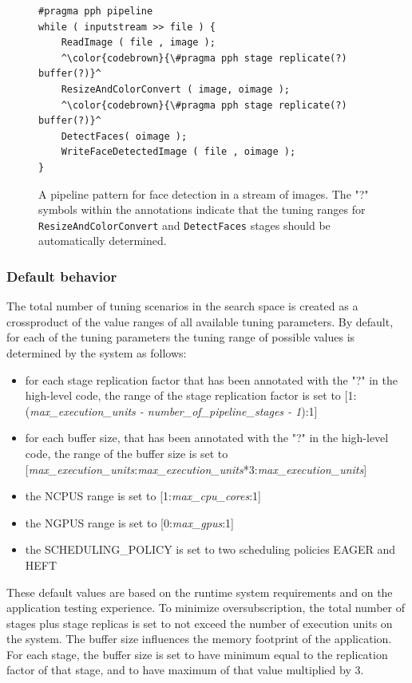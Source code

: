 \begin{figure}[h]
\centering
\begin{lstlisting}
#pragma pph pipeline
while ( inputstream >> file ) {
    ReadImage ( file , image );
    ^\color{codebrown}{\#pragma pph stage replicate(?) buffer(?)}^
    ResizeAndColorConvert ( image, oimage );
    ^\color{codebrown}{\#pragma pph stage replicate(?) buffer(?)}^
    DetectFaces( oimage );
    WriteFaceDetectedImage ( file , oimage );
}
\end{lstlisting}
\caption{A pipeline pattern for face detection in a stream of images. The "?" symbols within the annotations indicate that the tuning ranges for \texttt{ResizeAndColorConvert} and \texttt{DetectFaces} stages should be automatically determined.}
\label{fig:facedetect}
\end{figure}

\subsubsection{Default behavior}

The total number of tuning scenarios in the search space is created as a crossproduct of the value ranges of all available tuning parameters. By default, for each of the tuning parameters the tuning range of possible values is determined by the system as follows:  

\begin{itemize}
\item for each stage replication factor that has been annotated with the "?" in the high-level code, the range of the stage replication factor is set to [1:(\textit{max\_execution\_units - number\_of\_pipeline\_stages - 1}):1]
\item for each buffer size, that has been annotated with the "?" in the high-level code, the range of the buffer size is set to [\textit{max\_execution\_units}:\textit{max\_execution\_units}*3:\textit{max\_execution\_units}]
\item the NCPUS range is set to [1:\textit{max\_cpu\_cores}:1]
\item the NGPUS range is set to [0:\textit{max\_gpus}:1]
\item {the SCHEDULING\_POLICY is set to two scheduling policies EAGER and HEFT\footnotemark}
\end{itemize}

These default values are based on the runtime system requirements and on the application testing experience. To minimize oversubscription, the total number of stages plus stage replicas is set to not exceed the number of execution units on the system. The buffer size influences the memory footprint of the application. For each stage, the buffer size is set to have minimum equal to the replication factor of that stage, and to have maximum of that value multiplied by 3.    

